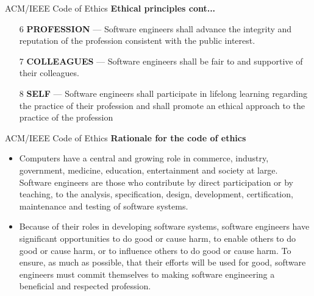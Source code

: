 \documentclass{beamer}
\begin{document}
\begin{frame}{ACM/IEEE Code of Ethics}
	\textbf{Ethical principles cont...}
	\begin{itemize}
		\item[6] \textbf{PROFESSION} — Software engineers shall advance the integrity and reputation of 
	the profession consistent with the public interest.
	\item[7] \textbf{COLLEAGUES} — Software engineers shall be fair to and supportive of their 
	colleagues.
	\item[8] \textbf{SELF} — Software engineers shall participate in lifelong learning regarding 
	the practice of their profession and shall promote an ethical approach to the 
	practice of the profession
	\end{itemize}
\end{frame}
\begin{frame}{ACM/IEEE Code of Ethics}
	\textbf{Rationale for the code of ethics}
	\begin{itemize}
		\item Computers have a central and growing role in commerce, industry, government, medicine, education, entertainment and society at large. Software engineers are those who contribute by direct participation or by teaching, to the analysis, specification, design, development, certification, maintenance and testing of software systems. 
		\item Because of their roles in developing software systems, software engineers have significant opportunities to do good or cause harm, to enable others to do good or cause harm, or to influence others to do good or cause harm. To ensure, as much as possible, that their efforts will be used for good, software engineers must commit themselves to making software engineering a beneficial and respected profession. 
		
	\end{itemize}
\end{frame}
\end{document}
